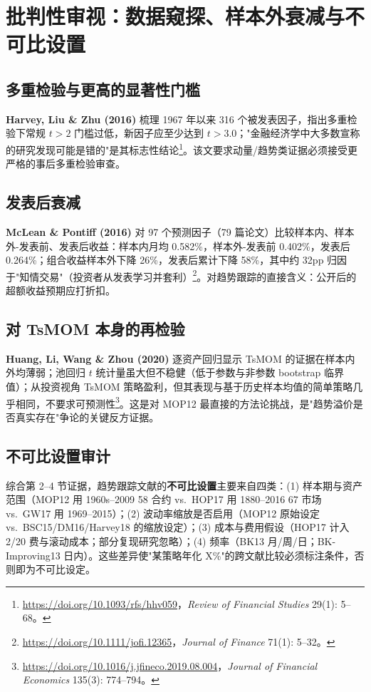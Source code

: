 \documentclass[11pt,a4paper]{article}
\begin{document}
\section{批判性审视：数据窥探、样本外衰减与不可比设置}
\subsection{多重检验与更高的显著性门槛}
\textbf{Harvey, Liu \& Zhu (2016)} 梳理 1967 年以来 316 个被发表因子，指出多重检验下常规 $t>2$ 门槛过低，新因子应至少达到 $t>3.0$；"金融经济学中大多数宣称的研究发现可能是错的"是其标志性结论\footnote{\url{https://doi.org/10.1093/rfs/hhv059}，\emph{Review of Financial Studies} 29(1): 5--68。}。该文要求动量/趋势类证据必须接受更严格的事后多重检验审查。

\subsection{发表后衰减}
\textbf{McLean \& Pontiff (2016)} 对 97 个预测因子（79 篇论文）比较样本内、样本外-发表前、发表后收益：样本内月均 0.582\%，样本外-发表前 0.402\%，发表后 0.264\%；组合收益样本外下降 26\%，发表后累计下降 58\%，其中约 32pp 归因于"知情交易"（投资者从发表学习并套利）\footnote{\url{https://doi.org/10.1111/jofi.12365}，\emph{Journal of Finance} 71(1): 5--32。}。对趋势跟踪的直接含义：公开后的超额收益预期应打折扣。

\subsection{对 TsMOM 本身的再检验}
\textbf{Huang, Li, Wang \& Zhou (2020)} 逐资产回归显示 TsMOM 的证据在样本内外均薄弱；池回归 $t$ 统计量虽大但不稳健（低于参数与非参数 bootstrap 临界值）；从投资视角 TsMOM 策略盈利，但其表现与基于历史样本均值的简单策略几乎相同，不要求可预测性\footnote{\url{https://doi.org/10.1016/j.jfineco.2019.08.004}，\emph{Journal of Financial Economics} 135(3): 774--794。}。这是对 MOP12 最直接的方法论挑战，是"趋势溢价是否真实存在"争论的关键反方证据。

\subsection{不可比设置审计}
综合第 2--4 节证据，趋势跟踪文献的\textbf{不可比设置}主要来自四类：(1) 样本期与资产范围（MOP12 用 1960s--2009 58 合约 vs.\ HOP17 用 1880--2016 67 市场 vs.\ GW17 用 1969--2015）；(2) 波动率缩放是否启用（MOP12 原始设定 vs.\ BSC15/DM16/Harvey18 的缩放设定）；(3) 成本与费用假设（HOP17 计入 2/20 费与滚动成本；部分复现研究忽略）；(4) 频率（BK13 月/周/日；BK-Improving13 日内）。这些差异使"某策略年化 X\%"的跨文献比较必须标注条件，否则即为不可比设定。
\end{document}
